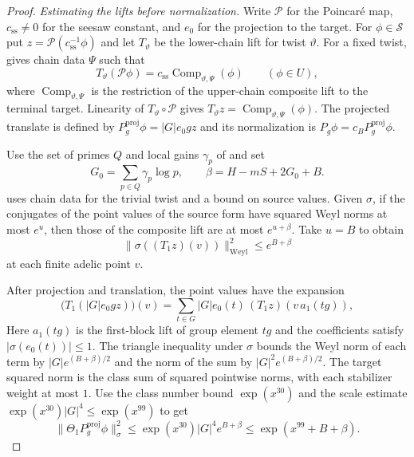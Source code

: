 \begin{proof}
\emph{Estimating the lifts before normalization.}
Write $\mathcal P$ for the Poincaré map, $c_{\mathrm{ss}}\ne0$ for the seesaw constant, and $e_0$ for the projection to the target. For $\phi\in\mathcal S$ put $z=\mathcal P(c_{\mathrm{ss}}^{-1}\phi)$ and let $T_\vartheta$ be the lower-chain lift for twist $\vartheta$. For a fixed twist,  gives chain data $\Psi$ such that
\[
 T_\vartheta(\mathcal P\phi)=
 c_{\mathrm{ss}}\operatorname{Comp}_{\vartheta,\Psi}(\phi)
 \qquad (\phi\in U),
\]
where $\operatorname{Comp}_{\vartheta,\Psi}$ is the restriction of the upper-chain composite lift to the terminal target. Linearity of $T_\vartheta\circ\mathcal P$ gives
$T_\vartheta z=\operatorname{Comp}_{\vartheta,\Psi}(\phi)$. The projected translate is defined by $P_g^{\mathrm{proj}}\phi=|G|e_0gz$ and its normalization is $P_g\phi=c_B P_g^{\mathrm{proj}}\phi$.

Use the set of primes $Q$ and local gains $\gamma_p$ of  and set
\[
 G_0=\sum_{p\in Q}\gamma_p\log p,\qquad
 \beta=H-mS+2G_0+B .
\]
 uses chain data for the trivial twist and a bound on source values. Given $\sigma$, if the conjugates of the point values of the source form have squared Weyl norms at most $e^u$, then those of the composite lift are at most $e^{u+\beta}$. Take $u=B$ to obtain
\[
 \|\sigma((T_1 z)(v))\|_{\mathrm{Weyl}}^2\le e^{B+\beta}
\]
at each finite adelic point $v$.

After projection and translation, the point values have the expansion
\[
 \bigl(T_1(|G|e_0gz)\bigr)(v)
   = \sum_{t\in G}|G| e_0(t)\,(T_1z)(v\,a_1(tg)),
\]
Here $a_1(tg)$ is the first-block lift of group element $tg$ and the coefficients satisfy $|\sigma(e_0(t))|\le1$. The triangle inequality under $\sigma$ bounds the Weyl norm of each term by $|G|e^{(B+\beta)/2}$ and the norm of the sum by $|G|^2e^{(B+\beta)/2}$. The target squared norm is the class sum of squared pointwise norms, with each stabilizer weight at most $1$. Use the class number bound $\exp(x^{30})$ and the scale estimate $\exp(x^{30})|G|^4\le\exp(x^{99})$ to get
\[
 \|\Theta_1 P_g^{\mathrm{proj}}\phi\|_\sigma^2
 \le \exp(x^{30})|G|^4 e^{B+\beta}
 \le \exp(x^{99}+B+\beta).
\]


\end{proof}
